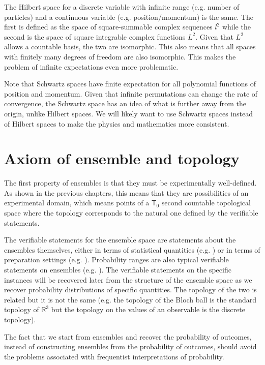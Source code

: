 The Hilbert space for a discrete variable with infinite range (e.g. number of particles) and a continuous variable (e.g. position/momentum) is the same. The first is defined as the space of square-summable complex sequences $l^2$ while the second is the space of square integrable complex functions $L^2$. Given that $L^2$ allows a countable basis, the two are isomorphic. This also means that all spaces with finitely many degrees of freedom are also isomorphic. This makes the problem of infinite expectations even more problematic.

Note that Schwartz spaces have finite expectation for all polynomial functions of position and momentum. Given that infinite permutations can change the rate of convergence, the Schwartz space has an idea of what is further away from the origin, unlike Hilbert spaces. We will likely want to use Schwartz spaces instead of Hilbert spaces to make the physics and mathematics more consistent.

\section{Axiom of ensemble and topology}

The first property of ensembles is that they must be experimentally well-defined. As shown in the previous chapters, this means that they are possibilities of an experimental domain, which means points of a $\textsf{T}_0$ second countable topological space where the topology corresponds to the natural one defined by the verifiable statements.

The verifiable statements for the ensemble space are statements about the ensembles themselves, either in terms of statistical quantities (e.g. ) or in terms of preparation settings (e.g. ). Probability ranges are also typical verifiable statements on ensembles (e.g. ). The verifiable statements on the specific instances will be recovered later from the structure of the ensemble space as we recover probability distributions of specific quantities. The topology of the two is related but it is not the same (e.g. the topology of the Bloch ball is the standard topology of $\mathbb{R}^3$ but the topology on the values of an observable is the discrete topology).

The fact that we start from ensembles and recover the probability of outcomes, instead of constructing ensembles from the probability of outcomes, should avoid the problems associated with frequentist interpretations of probability.

